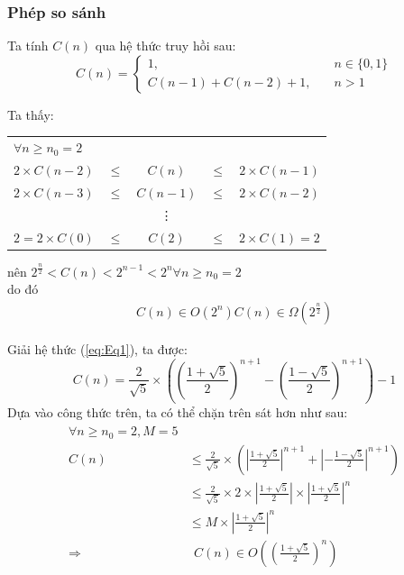 \documentclass{article}
\begin{document}
\subsubsection{Phép so sánh}
\begin{flushleft}
Ta tính $C(n)$ qua hệ thức truy hồi sau:\\
\begin{equation} \label{eq:Eq1}
C(n) = 
\begin{cases}
	1, & \quad n \in \{ 0, 1 \} \\
	C(n-1) + C(n-2) + 1, & \quad n > 1 
\end{cases} 
\end{equation}

Ta thấy:\\
\begin{center}
	\begin{tabular}{l c c c r}
		$\forall n \geq n_{0} = 2$\\
		$2 \times C(n-2)$ & $\leq$ & $C(n)$ & $\leq$ & $2 \times C(n-1)$\\
		$2 \times C(n-3)$ & $\leq$ & $C(n-1)$ & $\leq$ & $2 \times C(n-2)$\\
		&&\vdots&&\\
		$2 = 2 \times C(0)$ & $\leq$ & $C(2)$ & $\leq$ & $2 \times C(1) = 2$	
	\end{tabular}
\end{center}

nên $2^{\frac{n}{2}}   < C(n) <  2^{n-1} < 2^n \forall n \geq n_{0} = 2 $\\
do đó
\begin{gather}
	C(n) \in O(2^{n})
	C(n) \in \Omega (2^{\frac{n}{2}})
\end{gather}



Giải hệ thức (\ref{eq:Eq1}), ta được:\\
\begin{equation}\label{eq:Eq3}
C(n) = \frac{2}{\sqrt{5}}  \times \left( \left( \frac{1+\sqrt{5}}{2} \right) ^{n+1} - \left( \frac{1-\sqrt{5}}{2} \right) ^{n+1} \right)-1
\end{equation}
Dựa vào công thức trên, ta có thể chặn trên sát hơn như sau:
\begin{gather}
\begin{align*}
	\forall n \geq n_{0} = 2, M = 5\\
 	C(n)  &\leq \frac{2}{\sqrt{5}}  \times \left( \left|  \frac{1+\sqrt{5}}{2} \right| ^{n+1} + \left| -\frac{1-\sqrt{5}}{2} \right| ^{n+1} \right)\\
	&\leq \frac{2}{\sqrt{5}}  \times 2 \times  \left|  \frac{1+\sqrt{5}}{2} \right| \times  \left|  \frac{1+\sqrt{5}}{2} \right| ^{n} \\
	&\leq M \times \left|  \frac{1+\sqrt{5}}{2} \right| ^{n}\\
	\Rightarrow &~~ C(n) \in O \left( \left( \frac{1+\sqrt{5}}{2} \right) ^{n}  \right)
\end{align*}
\end{gather}


\end{flushleft}
\end{document}
